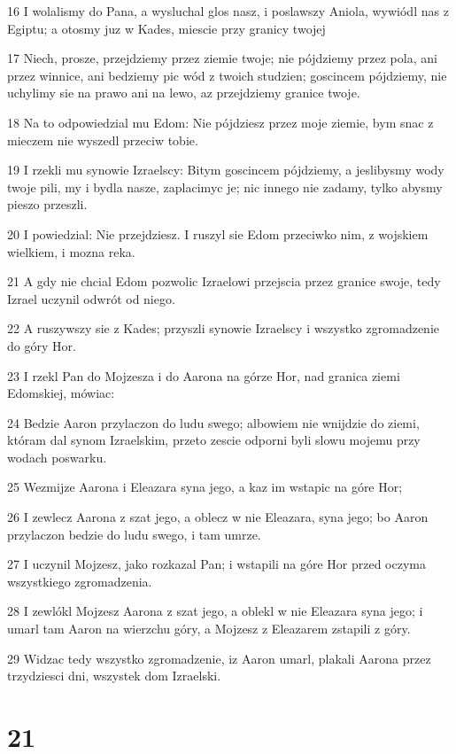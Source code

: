 \par 16 I wolalismy do Pana, a wysluchal glos nasz, i poslawszy Aniola, wywiódl nas z Egiptu; a otosmy juz w Kades, miescie przy granicy twojej
\par 17 Niech, prosze, przejdziemy przez ziemie twoje; nie pójdziemy przez pola, ani przez winnice, ani bedziemy pic wód z twoich studzien; goscincem pójdziemy, nie uchylimy sie na prawo ani na lewo, az przejdziemy granice twoje.
\par 18 Na to odpowiedzial mu Edom: Nie pójdziesz przez moje ziemie, bym snac z mieczem nie wyszedl przeciw tobie.
\par 19 I rzekli mu synowie Izraelscy: Bitym goscincem pójdziemy, a jeslibysmy wody twoje pili, my i bydla nasze, zaplacimyc je; nic innego nie zadamy, tylko abysmy pieszo przeszli.
\par 20 I powiedzial: Nie przejdziesz. I ruszyl sie Edom przeciwko nim, z wojskiem wielkiem, i mozna reka.
\par 21 A gdy nie chcial Edom pozwolic Izraelowi przejscia przez granice swoje, tedy Izrael uczynil odwrót od niego.
\par 22 A ruszywszy sie z Kades; przyszli synowie Izraelscy i wszystko zgromadzenie do góry Hor.
\par 23 I rzekl Pan do Mojzesza i do Aarona na górze Hor, nad granica ziemi Edomskiej, mówiac:
\par 24 Bedzie Aaron przylaczon do ludu swego; albowiem nie wnijdzie do ziemi, któram dal synom Izraelskim, przeto zescie odporni byli slowu mojemu przy wodach poswarku.
\par 25 Wezmijze Aarona i Eleazara syna jego, a kaz im wstapic na góre Hor;
\par 26 I zewlecz Aarona z szat jego, a oblecz w nie Eleazara, syna jego; bo Aaron przylaczon bedzie do ludu swego, i tam umrze.
\par 27 I uczynil Mojzesz, jako rozkazal Pan; i wstapili na góre Hor przed oczyma wszystkiego zgromadzenia.
\par 28 I zewlókl Mojzesz Aarona z szat jego, a oblekl w nie Eleazara syna jego; i umarl tam Aaron na wierzchu góry, a Mojzesz z Eleazarem zstapili z góry.
\par 29 Widzac tedy wszystko zgromadzenie, iz Aaron umarl, plakali Aarona przez trzydziesci dni, wszystek dom Izraelski.

\chapter{21}

